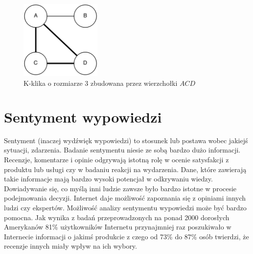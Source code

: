 \clearpage
\begin{figure}[ht!]
\centering
\includegraphics[width=40mm]{img/klika.png}
\caption{K-klika o rozmiarze 3 zbudowana przez wierzchołki $ACD$}
\label{image:klika}
\end{figure}








\section{Sentyment wypowiedzi}
Sentyment (inaczej wydźwięk wypowiedzi) to stosunek lub postawa wobec jakiejś
sytuacji, zdarzenia. Badanie sentymentu niesie ze sobą bardzo dużo informacji.
Recenzje, komentarze i opinie odgrywają istotną rolę w ocenie satysfakcji z
produktu lub usługi czy w badaniu reakcji na wydarzenia. Dane, które zawierają
takie informacje mają bardzo wysoki potencjał w odkrywaniu wiedzy.
Dowiadywanie się, co myślą inni ludzie zawsze było bardzo istotne w procesie
podejmowania decyzji. Internet daje możliwość zapoznania się z opiniami innych
ludzi czy ekspertów. Możliwość analizy sentymentu wypowiedzi może być bardzo
pomocna. Jak wynika z badań przeprowadzonych na ponad 2000 dorosłych Amerykanów
\cite{pangLee} 81\% użytkowników Internetu przynajmniej raz poszukiwało w
Internecie informacji o jakimś produkcie z czego od 73\% do 87\% osób twierdzi,
że recenzje innych miały wpływ na ich wybory.


